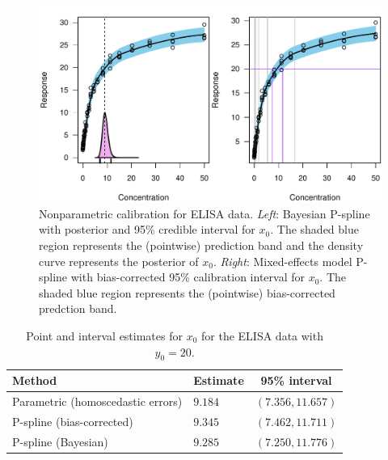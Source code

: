 \documentclass[cmfont,usenames,dvipsnames,leqno]{afit-etd}\usepackage[]{graphicx}\usepackage[]{color}
\makeatletter
\def\maxwidth{ %
  \ifdim\Gin@nat@width>\linewidth
    \linewidth
  \else
    \Gin@nat@width
  \fi
}
\newenvironment{knitrout}{}{} %
\renewenvironment{knitrout}{\begin{singlespace}}{\end{singlespace}}
\makeatother
\begin{document}
\begin{knitrout}
\color{fgcolor}\begin{figure}[H]

\includegraphics[width=\maxwidth]{figure/elisa-jags} \caption[Bayesian nonparametric calibration for ELISA data]{Nonparametric calibration for ELISA data. \textit{Left}: Bayesian \ac{P-spline} with posterior and 95\% credible interval for $x_0$. The shaded blue region represents the (pointwise) prediction band and the density curve represents the posterior of $x_0$. \textit{Right}: Mixed-effects model \ac{P-spline} with bias-corrected 95\% calibration interval for $x_0$. The shaded blue region represents the (pointwise) bias-corrected predction band.\label{fig:elisa-jags}}
\end{figure}


\end{knitrout}


\begin{table}[H]
\label{tab:elisa}
\centering
\begin{tabular}{llc}
  \toprule
  \textbf{Method} & \textbf{Estimate} & \textbf{95\% interval} \\
  \midrule
  Parametric (homoscedastic errors)   & $9.184$ & $(7.356, 11.657)$ \\
  \ac{P-spline} (bias-corrected)            & $9.345$ & $(7.462, 11.711)$ \\
  \ac{P-spline} (Bayesian)                 & $9.285$ & $(7.250, 11.776)$ \\
  \bottomrule
\end{tabular}
\caption[Calibration results for the ELISA data]{Point and interval estimates for $x_0$ for the ELISA data with $y_0 = 20$.}
\end{table}
\end{document}
